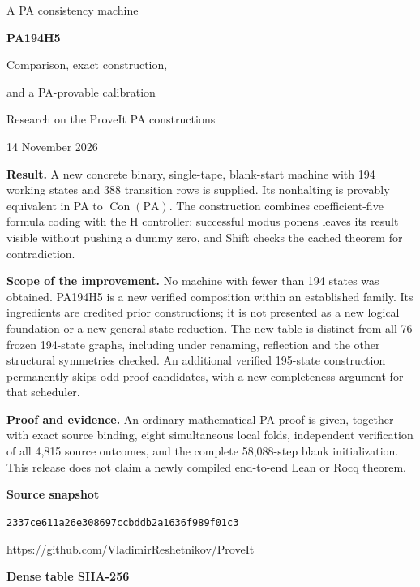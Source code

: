 \documentclass[11pt]{article}
\theoremstyle{definition}\newtheorem{definition}[theorem]{Definition}
\newcommand{\PA}{\mathrm{PA}}
\newcommand{\Con}{\operatorname{Con}}
\newcommand{\snapshot}{\texttt{2337ce611a26e308697ccbddb2a1636f989f01c3}}
\begin{document}
\hypersetup{pageanchor=false}
\begin{titlepage}
\vspace*{0.5in}
{\Large\color{ink} A PA consistency machine\par}
\vspace{0.2in}
{\Huge\bfseries PA194H5\par}
\vspace{0.2in}
{\LARGE Comparison, exact construction,\par and a PA-provable calibration\par}
\vspace{0.5in}
{\large Research on the ProveIt PA constructions\par}
{\large 14 November 2026\par}
\vspace{0.5in}
\begin{minipage}{0.96\textwidth}
\textbf{Result.} A new concrete binary, single-tape, blank-start machine
with 194 working states and 388 transition rows is supplied. Its nonhalting
is provably equivalent in PA to $\Con(\PA)$. The construction combines
coefficient-five formula coding with the H controller: successful modus
ponens leaves its result visible without pushing a dummy zero, and Shift
checks the cached theorem for contradiction.

\medskip
\textbf{Scope of the improvement.} No machine with fewer than 194 states
was obtained. PA194H5 is a new verified composition within an established
family. Its ingredients are credited prior constructions; it is not
presented as a new logical foundation or a new general state reduction.
The new table is distinct from all 76 frozen 194-state graphs, including
under renaming, reflection and the other structural symmetries checked.
An additional verified 195-state construction permanently skips odd
proof candidates, with a new completeness argument for that scheduler.

\medskip
\textbf{Proof and evidence.} An ordinary mathematical PA proof is given,
together with exact source binding, eight simultaneous local folds,
independent verification of all 4,815 source outcomes, and the complete
58,088-step blank initialization. This release does not claim a newly
compiled end-to-end Lean or Rocq theorem.
\end{minipage}
\vfill
\noindent\textbf{Source snapshot}\par
\snapshot\par
\small\url{https://github.com/VladimirReshetnikov/ProveIt}\par
\vspace{0.15in}
\noindent\textbf{Dense table SHA-256}\par
\small{}
\end{titlepage}
\hypersetup{pageanchor=true}
\tableofcontents
\clearpage
{}
\end{document}
